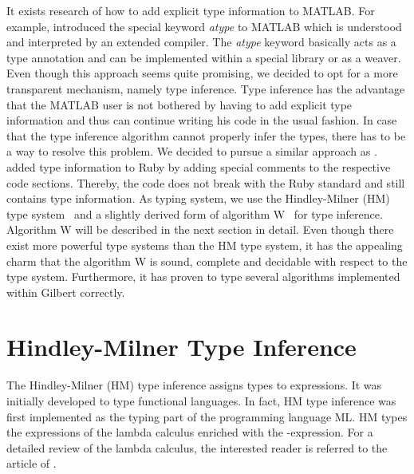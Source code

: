 It exists research of how to add explicit type information to MATLAB.
For example, \textcite{hendren:2011a} introduced the special keyword \emph{atype} to MATLAB which is understood and interpreted by an extended compiler.
The \emph{atype} keyword basically acts as a type annotation and can be implemented within a special library or as a weaver.
Even though this approach seems quite promising, we decided to opt for a more transparent mechanism, namely type inference.
Type inference has the advantage that the MATLAB user is not bothered by having to add explicit type information and thus can continue writing his code in the usual fashion.
In case that the type inference algorithm cannot properly infer the types, there has to be a way to resolve this problem.
We decided to pursue a similar approach as \textcite{furr:2009a}.
\citeauthor{furr:2009a} added type information to Ruby by adding special comments to the respective code sections.
Thereby, the code does not break with the Ruby standard and still contains type information.
As typing system, we use the Hindley-Milner (HM) type system~\cite{hindley:tams1969a,milner:jcss1978a} and a slightly derived form of algorithm W~\cite{damas:1982a} for type inference.
Algorithm W will be described in the next section in detail.
Even though there exist more powerful type systems than the HM type system, it has the appealing charm that the algorithm W is sound, complete and decidable with respect to the type system.
Furthermore, it has proven to type several algorithms implemented within Gilbert correctly.

\section{Hindley-Milner Type Inference}
\label{sec:hmInference}

The Hindley-Milner (HM) type inference assigns types to expressions.
It was initially developed to type functional languages.
In fact, HM type inference was first implemented as the typing part of the programming language ML.
HM types the expressions of the lambda calculus enriched with the -expression.
For a detailed review of the lambda calculus, the interested reader is referred to the article of \textcite{cardone:hhl2006a}.

